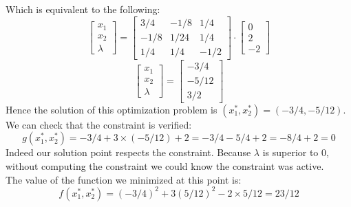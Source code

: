 \documentclass[a4paper, 10pt]{article}
\begin{document}
Which is equivalent to the following:
$$
\begin{bmatrix}
    x_1\\
    x_2\\
    \lambda
\end{bmatrix} =\begin{bmatrix}
    3/4 & -1/8 & 1/4\\
    -1/8 & 1/24 & 1/4\\
    1/4 & 1/4 & -1/2
\end{bmatrix} \cdot \begin{bmatrix}
    0\\
    2\\
    -2
\end{bmatrix}
$$
$$
\begin{bmatrix}
    x_1\\
    x_2\\
    \lambda
\end{bmatrix} = \begin{bmatrix}
    -3/4\\
    -5/12\\
    3/2
\end{bmatrix}
$$
Hence the solution of this optimization problem is $(x_1^*,x_2^*)=(-3/4, -5/12)$.\\
We can check that the constraint is verified:
$$
g(x_1^*,x_2^*) = -3/4+3\times (-5/12)+2 =-3/4-5/4+2 = -8/4+2 = 0 
$$
Indeed our solution point respects the constraint. Because $\lambda$ is superior to $0$,
without computing the constraint we could know the constraint was active.
\\
The value of the function we minimized at this point is:
$$
f(x_1^*,x_2^*) = (-3/4)^2+3(5/12)^2-2\times5/12 = 23/12
$$
\end{document}
